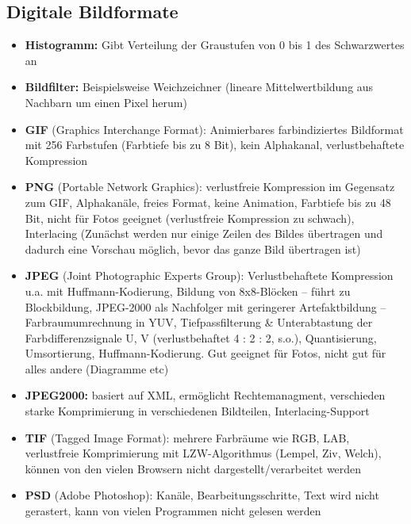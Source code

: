 \documentclass[12pt,landscape]{article}
\begin{document}
\begin{multicols}{3}
\subsection{Digitale Bildformate}
\begin{itemize}
\item \textbf{Histogramm:} Gibt Verteilung der Graustufen von 0 bis 1 des Schwarzwertes an
\item \textbf{Bildfilter:} Beispielsweise Weichzeichner (lineare Mittelwertbildung aus Nachbarn um einen Pixel herum)
\item \textbf{GIF} (Graphics Interchange Format): Animierbares farbindiziertes Bildformat mit 256 Farbstufen (Farbtiefe bis zu 8 Bit), kein Alphakanal, verlustbehaftete Kompression
\item \textbf{PNG} (Portable Network Graphics): verlustfreie Kompression im Gegensatz zum GIF, Alphakanäle, freies Format, keine Animation, Farbtiefe bis zu 48 Bit, nicht für Fotos geeignet (verlustfreie Kompression zu schwach), Interlacing (Zunächst werden nur einige Zeilen des Bildes übertragen und dadurch eine Vorschau möglich, bevor das ganze Bild übertragen ist)
\item \textbf{JPEG} (Joint Photographic Experts Group): Verlustbehaftete Kompression u.a. mit Huffmann-Kodierung, Bildung von 8x8-Blöcken -- führt zu Blockbildung, JPEG-2000 als Nachfolger mit geringerer Artefaktbildung -- Farbraumumrechnung in YUV, Tiefpassfilterung \& Unterabtastung der Farbdifferenzsignale U, V (verlustbehaftet 4 : 2 : 2, s.o.), Quantisierung, Umsortierung, Huffmann-Kodierung. Gut geeignet für Fotos, nicht gut für alles andere (Diagramme etc)
\item \textbf{JPEG2000:} basiert auf XML, ermöglicht Rechtemanagment, verschieden starke Komprimierung in verschiedenen Bildteilen, Interlacing-Support
\item \textbf{TIF} (Tagged Image Format): mehrere Farbräume wie RGB, LAB, verlustfreie Komprimierung mit LZW-Algorithmus (Lempel, Ziv, Welch), können von den vielen Browsern nicht  dargestellt/verarbeitet werden
\item \textbf{PSD} (Adobe Photoshop): Kanäle, Bearbeitungsschritte, Text wird nicht gerastert, kann von vielen Programmen nicht gelesen werden
\end{itemize}

\end{multicols}
\end{document}
